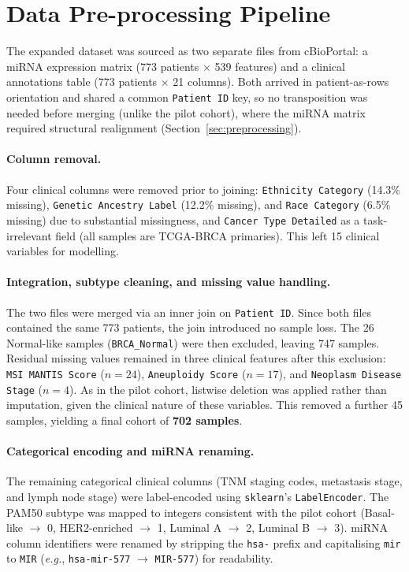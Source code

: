 \FloatBarrier
\section{Data Pre-processing Pipeline}
\label{sec:expanded_preprocessing}

The expanded dataset was sourced as two separate files from cBioPortal: a miRNA
expression matrix (773 patients $\times$ 539
features) and a clinical annotations table (773 patients $\times$ 21 columns). 
Both arrived in patient-as-rows orientation and
shared a common \texttt{Patient ID} key, so no transposition was needed before
merging (unlike the pilot cohort), where the miRNA matrix required structural
realignment (Section~\ref{sec:preprocessing}).

\paragraph{Column removal.}
Four clinical columns were removed prior to joining: \texttt{Ethnicity Category}
(14.3\% missing), \texttt{Genetic Ancestry Label} (12.2\% missing), and
\texttt{Race Category} (6.5\% missing) due to substantial missingness, and
\texttt{Cancer Type Detailed} as a task-irrelevant field (all samples are
TCGA-BRCA primaries). This left 15 clinical variables for modelling.

\paragraph{Integration, subtype cleaning, and missing value handling.}
The two files were merged via an inner join on \texttt{Patient ID}. Since both
files contained the same 773 patients, the join introduced no sample loss.
The 26 Normal-like samples (\texttt{BRCA\_Normal}) were then excluded, leaving 747
samples. Residual missing values remained in three clinical features after this
exclusion: \texttt{MSI MANTIS Score} ($n = 24$), \texttt{Aneuploidy Score}
($n = 17$), and \texttt{Neoplasm Disease Stage} ($n = 4$). As in the pilot cohort,
listwise deletion was applied rather than imputation, given the clinical nature of
these variables. This removed a further 45 samples, yielding a final cohort of
\textbf{702 samples}.

\paragraph{Categorical encoding and miRNA renaming.}
The remaining categorical clinical columns (TNM staging codes, metastasis stage,
and lymph node stage) were label-encoded using \texttt{sklearn}'s
\texttt{LabelEncoder}. The PAM50 subtype was mapped to integers consistent with
the pilot cohort (Basal-like $\to$ 0, HER2-enriched $\to$ 1, Luminal A $\to$ 2,
Luminal B $\to$ 3). miRNA column identifiers were renamed by stripping the
\texttt{hsa-} prefix and capitalising \texttt{mir} to \texttt{MIR}
(\textit{e.g.}, \texttt{hsa-mir-577} $\to$ \texttt{MIR-577}) for readability.

